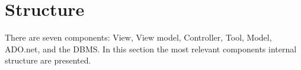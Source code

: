 \section{Structure}
There are seven components: View, View model, Controller, Tool, Model, ADO.net, and the DBMS. In this section the most relevant components internal structure are presented. 
 





